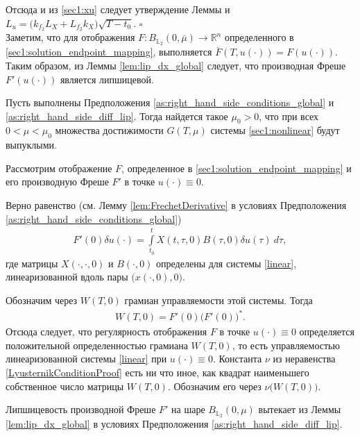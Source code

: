 \documentclass[../main.tex]{subfiles}
\begin{document}
	Отсюда и из \eqref{sec1:xu} следует утверждение Леммы и $L_u =	\Big( k_{f_2} L_X + L_{f_2} k_X \Big) \sqrt{T - t_0} $.
	\hfill$\square$\\[1ex]%
	
	Заметим, что для отображения $F: B_{\mathbb{L}_2}(0,\overline{\mu}) \to \mathbb{R}^n$ определенного в \eqref{sec1:solution_endpoint_mapping}, выполняется $\overline{F}(T, u(\cdot)) = F(u(\cdot))$.  Таким образом, из Леммы \ref{lem:lip_dx_global} следует, что производная Фреше $F'(u(\cdot)) $ является липшицевой. 
	
	\begin{theorem}\label{th:small_control_convexity}
		Пусть выполнены Предположения \ref{as:right_hand_side_conditions_global} и \ref{as:right_hand_side_diff_lip}. Тогда найдется такое $\mu_0 > 0$, что при всех $0 < \mu <  \mu_0 $ множества достижимости $G(T, \mu)$ системы \eqref{sec1:nonlinear} будут выпуклыми.
	\end{theorem}
	\doc
	Рассмотрим отображение $F$, определенное в \eqref{sec1:solution_endpoint_mapping} и его производную Фреше $F'$ в точке $u(\cdot) \equiv 0$. 
	
	Верно равенство (см.  Лемму \ref{lem:FrechetDerivative} в условиях Предположения  \ref{as:right_hand_side_conditions_global})
	\begin{gather*}
				F'(0) \delta u(\cdot) =  \int\limits_{t_0}^{t} X(t, \tau, 0) B(\tau, 0) \delta u(\tau) \ d\tau,
	\end{gather*}
	где матрицы $X(\cdot, \cdot, 0)$  и $B(\cdot, 0)$ определены для системы \eqref{linear}, линеаризованной вдоль пары $\Big(x(\cdot, 0), 0\Big) $.
	
	Обозначим через  $W(T,0) $ грамиан управляемости этой системы.
	Тогда 
	\begin{gather}
		W(T,0) = F'(0) \big(F'(0)\big)^*.
	\end{gather}
	Отсюда следует, что  регулярность отображения  $F$ в точке $u(\cdot) \equiv 0$ определяется положительной определенностью грамиана  $W(T,0) $, то есть управляемостью линеаризованной системы \eqref{linear} при $u(\cdot) \equiv 0$. 
	Константа $\nu$ из неравенства \eqref{LyusternikConditionProof} есть ни что иное, как квадрат наименьшего собственное число матрицы $W(T,0) $.
	Обозначим его через $\nu\big(W(T,0)\big)$.
	
	Липшицевость производной Фреше $F'$ на шаре $B_{\mathbb{L}_2}(0,\mu)$ вытекает из Леммы \ref{lem:lip_dx_global} в условиях Предположения \ref{as:right_hand_side_diff_lip}. 
	
\end{document}
